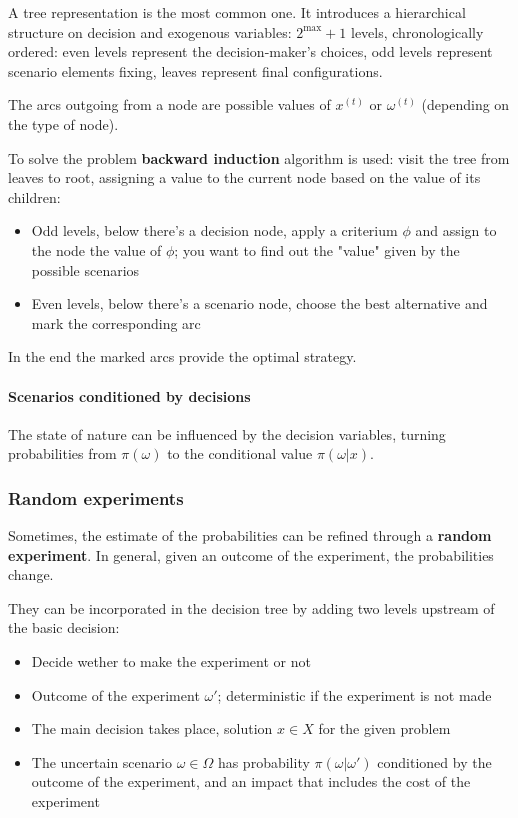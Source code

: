 A tree representation is the most common one. It introduces a hierarchical structure on decision and exogenous variables: $2^{\max} + 1$ levels, chronologically ordered: even levels represent the decision-maker's choices, odd levels represent scenario elements fixing, leaves represent final configurations.

The arcs outgoing from a node are possible values of $x^{(t)}$ or $\omega^{(t)}$ (depending on the type of node).

To solve the problem \textbf{backward induction} algorithm is used: visit the tree from leaves to root, assigning a value to the current node based on the value of its children: 
\begin{itemize}
	\item Odd levels, below there's a decision node, apply a criterium $\phi$ and assign to the node the value of $\phi$; you want to find out the "value" given by the possible scenarios
	
	\item Even levels, below there's a scenario node, choose the best alternative and mark the corresponding arc 
\end{itemize}

In the end the marked arcs provide the optimal strategy.

\paragraph{Scenarios conditioned by decisions} The state of nature can be influenced by the decision variables, turning probabilities from $\pi (\omega)$ to the conditional value $\pi (\omega | x)$. 

\subsubsection{Random experiments}

Sometimes, the estimate of the probabilities can be refined through a \textbf{random experiment}. In general, given an outcome of the experiment, the probabilities change. 

They can be incorporated in the decision tree by adding two levels upstream of the basic decision: 
\begin{itemize}
	\item Decide wether to make the experiment or not
	
	\item Outcome of the experiment $\omega'$; deterministic if the experiment is not made
	
	\item The main decision takes place, solution $x \in X$ for the given problem 
	
	\item The uncertain scenario $\omega \in \Omega$ has probability $\pi (\omega | \omega')$ conditioned by the outcome of the experiment, and an impact that includes the cost of the experiment
\end{itemize}

